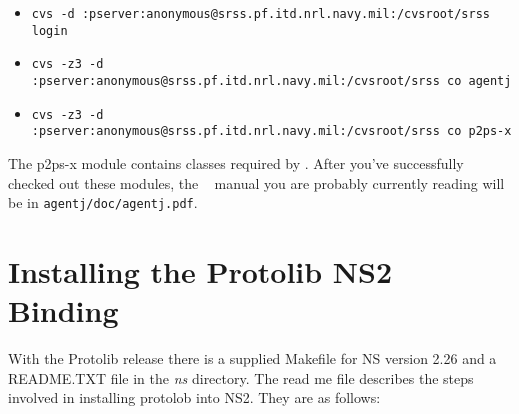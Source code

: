 \begin{itemize}
\item{{\tt cvs -d :pserver:anonymous@srss.pf.itd.nrl.navy.mil:/cvsroot/srss login}}
\item{{\tt cvs -z3 -d :pserver:anonymous@srss.pf.itd.nrl.navy.mil:/cvsroot/srss co agentj}}
\item{{\tt cvs -z3 -d :pserver:anonymous@srss.pf.itd.nrl.navy.mil:/cvsroot/srss co p2ps-x}}
\end{itemize}


The p2ps-x module contains classes required by \agentj.  After you've
successfully checked out these modules, the \agentj~ manual you are probably
currently reading will be in {\tt agentj/doc/agentj.pdf}.


\section{Installing the Protolib NS2 Binding}
\label{install:protolib}

With the Protolib release there is a supplied Makefile for NS version
2.26 and a README.TXT file in the \emph{ns} directory. The read me 
file describes the steps involved in installing protolob into NS2. They
are as follows:
 

